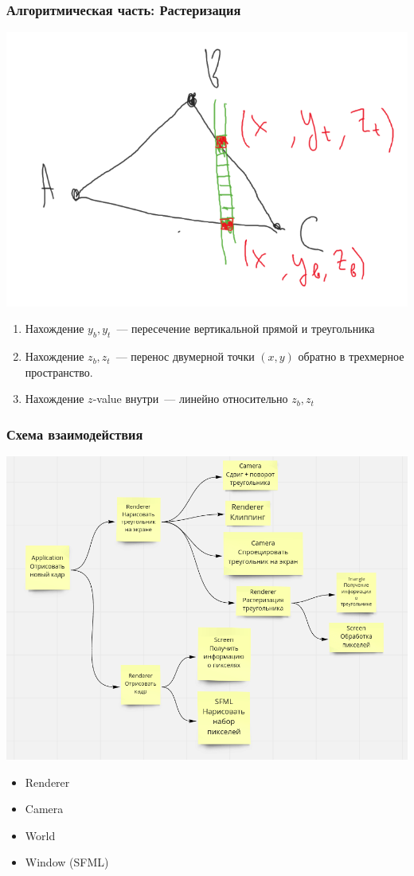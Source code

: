 \documentclass{beamer}
\begin{document}
\begin{frame}
\frametitle{Алгоритмическая часть: Растеризация}

\begin{center}
\includegraphics[width=0.5 \linewidth]{sweepline_1.png}
\end{center}

\begin{enumerate}
\item Нахождение $y_b, y_t$~--- пересечение вертикальной прямой и треугольника
\item Нахождение $z_b, z_t$~--- перенос двумерной точки $(x, y)$ обратно в трехмерное пространство.
\item Нахождение $z$-value внутри~--- линейно относительно  $z_b, z_t$
\end{enumerate}

\end{frame}


\begin{frame}
\frametitle{Схема взаимодействия}

\begin{center}

\includegraphics[width=0.6 \linewidth]{scheme_pipeline.png}

\end{center}

\begin{itemize}
\item Renderer
\item Camera
\item World
\item Window (SFML)
\end{itemize}

\end{frame}
\end{document}
